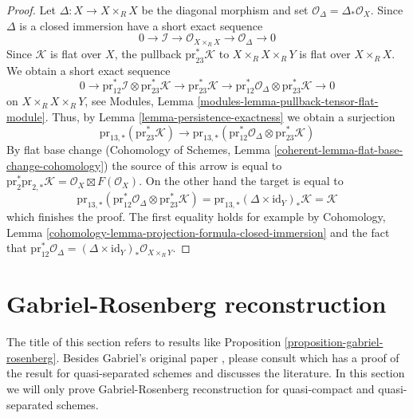 \begin{proof}
Let $\Delta : X \to X \times_R X$ be the diagonal morphism and
set $\mathcal{O}_\Delta = \Delta_*\mathcal{O}_X$.
Since $\Delta$ is a closed immersion have a short exact sequence
$$
0 \to \mathcal{I} \to 
\mathcal{O}_{X \times_R X} \to \mathcal{O}_\Delta \to 0
$$
Since $\mathcal{K}$ is flat over $X$, the pullback
$\text{pr}_{23}^*\mathcal{K}$ to $X \times_R X \times_R Y$
is flat over $X \times_R X$. We obtain a short exact sequence
$$
0 \to 
\text{pr}_{12}^*\mathcal{I}
\otimes
\text{pr}_{23}^*\mathcal{K} \to
\text{pr}_{23}^*\mathcal{K} \to
\text{pr}_{12}^*\mathcal{O}_\Delta
\otimes
\text{pr}_{23}^*\mathcal{K} \to 0
$$
on $X \times_R X \times_R Y$, see
Modules, Lemma \ref{modules-lemma-pullback-tensor-flat-module}.
Thus, by Lemma \ref{lemma-persistence-exactness}
we obtain a surjection
$$
\text{pr}_{13, *}(\text{pr}_{23}^*\mathcal{K})
\to
\text{pr}_{13, *}(
\text{pr}_{12}^*\mathcal{O}_\Delta
\otimes
\text{pr}_{23}^*\mathcal{K})
$$
By flat base change
(Cohomology of Schemes, Lemma \ref{coherent-lemma-flat-base-change-cohomology})
the source of this arrow is equal to $\text{pr}_2^*\text{pr}_{2, *}\mathcal{K}
= \mathcal{O}_X \boxtimes F(\mathcal{O}_X)$. On the other hand the target is
equal to
$$
\text{pr}_{13, *}(
\text{pr}_{12}^*\mathcal{O}_\Delta
\otimes
\text{pr}_{23}^*\mathcal{K}) =
\text{pr}_{13, *} (\Delta \times \text{id}_Y)_* \mathcal{K} =
\mathcal{K}
$$
which finishes the proof. The first equality holds for example by
Cohomology, Lemma \ref{cohomology-lemma-projection-formula-closed-immersion}
and the fact that $\text{pr}_{12}^*\mathcal{O}_\Delta =
(\Delta \times \text{id}_Y)_*\mathcal{O}_{X \times_R Y}$.
\end{proof}










\section{Gabriel-Rosenberg reconstruction}
\label{section-gabriel}

\noindent
The title of this section refers to results like
Proposition \ref{proposition-gabriel-rosenberg}.
Besides Gabriel's original paper \cite{Gabriel}, please consult
\cite{Brandenburg} which has a proof of the result for quasi-separated schemes
and discusses the literature. In this section we will only prove
Gabriel-Rosenberg reconstruction for quasi-compact and quasi-separated schemes.

